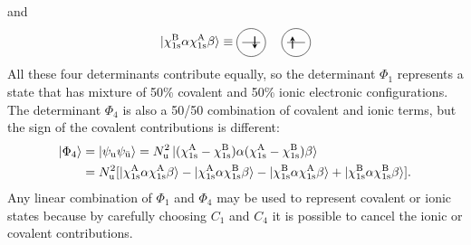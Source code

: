\documentclass[../Main/chem532-notes.tex]{subfiles}
\begin{document}
and
\begin{equation}
 \ket{\chi_{1\rm s}^{\rm B}\alpha \chi_{1\rm s}^{\rm A}\beta} \equiv 
 \begin{tikzpicture}[baseline={([yshift=-.5ex]current bounding box.center)},vertex/.style={anchor=base, minimum size=18pt, inner sep=2pt}]
    \draw (0.25,0.5) circle (0.4);
    \draw (0,0.5) -- (0.5,0.5);
    \draw[thick,<-,>=stealth] (0.35,0.325) -- (0.35,0.675);    
    \draw[thick,->,>=stealth] (1.4,0.325) -- (1.4,0.675);
    \draw (1.5,0.5) circle (0.4);
    \draw (1.25,0.5) -- (1.75,0.5);
  \end{tikzpicture}
\end{equation}
All these four determinants contribute equally, so the determinant $\Phi_1$ represents a state that has mixture of 50\% covalent and 50\% ionic electronic configurations.
The determinant $\Phi_4$ is also a 50/50 combination of covalent and ionic terms, but the sign of the covalent contributions is different:
\begin{equation}
\begin{split}
\ket{\Phi_4} &= \ket{\psi_{\mathrm{u}} \psi_{\bar{\mathrm{u}}}} = N_{\mathrm{u}}^2 \ket{ (\chi_{1\rm s}^{\rm A} - \chi_{1\rm s}^{\rm B}) \alpha  (\chi_{1\rm s}^{\rm A} - \chi_{1\rm s}^{\rm B}) \beta} \\
&= N_{\mathrm{u}}^2 [ \ket{\chi_{1\rm s}^{\rm A}\alpha \chi_{1\rm s}^{\rm A}\beta}
- \ket{\chi_{1\rm s}^{\rm A}\alpha \chi_{1\rm s}^{\rm B}\beta}
- \ket{\chi_{1\rm s}^{\rm B}\alpha \chi_{1\rm s}^{\rm A}\beta} 
+\ket{\chi_{1\rm s}^{\rm B}\alpha \chi_{1\rm s}^{\rm B}\beta}].
\end{split}
\end{equation}
Any linear combination of $\Phi_1$ and $\Phi_4$ may be used to represent covalent or ionic states because by carefully choosing $C_1$ and $C_4$ it is possible to cancel the ionic or covalent contributions.
\end{document}
